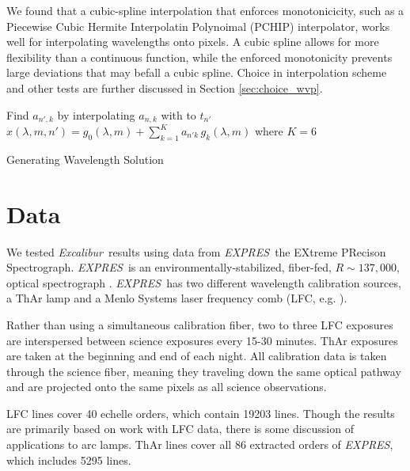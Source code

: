 \documentclass[modern]{aastex63}
\newcommand{\project}[1]{\textsl{#1}}
\newcommand{\name}{\project{Excalibur}}
\newcommand{\acronym}[1]{{\small{#1}}}
\newcommand{\expres}{\project{\acronym{EXPRES}}}
\begin{document}
We found that a cubic-spline interpolation that enforces monotonicicity, such as a Piecewise Cubic Hermite Interpolatin Polynoimal (PCHIP) interpolator, works well for interpolating wavelengths onto pixels.  A cubic spline allows for more flexibility than a continuous function, while the enforced monotonicity prevents large deviations that may befall a cubic spline.  Choice in interpolation scheme and other tests are further discussed in Section \ref{sec:choice_wvp}.

\begin{algorithm}
\SetAlgoLined
{}

Find $a_{n',k}$ by interpolating $a_{n,k}$ with to $t_{n'}$\;
$x(\lambda,m,n') = g_0(\lambda,m) + \sum_{k=1}^K a_{n'k}\,g_k(\lambda,m)$ where $K=6$\;
\caption{Generating Wavelength Solution}
\end{algorithm}


\section{Data} \label{sec:data}
We tested \name\ results using data from \expres\, the EXtreme PRecison Spectrograph.  \expres\ is an environmentally-stabilized, fiber-fed, $R\sim137,000$, optical spectrograph \citep{jurgenson2016, blackman2020}.  \expres\ has two different wavelength calibration sources, a ThAr lamp and a Menlo Systems laser frequency comb (LFC, e.g. \cite{wilken2012, molaro2013, probst2014}).

Rather than using a simultaneous calibration fiber, two to three LFC exposures are interspersed between science exposures every 15-30 minutes.  ThAr exposures are taken at the beginning and end of each night.  All calibration data is taken through the science fiber, meaning they traveling down the same optical pathway and are projected onto the same pixels as all science observations.

LFC lines cover 40 echelle orders, which contain 19203 lines.  Though the results are primarily based on work with LFC data, there is some discussion of applications to arc lamps.   ThAr lines cover all 86 extracted orders of \expres, which includes 5295 lines.
\end{document}
